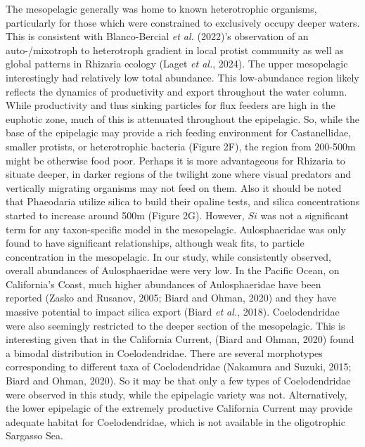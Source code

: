 \documentclass[
]{article}
\begin{document}
The mesopelagic generally was home to known heterotrophic organisms,
particularly for those which were constrained to exclusively occupy
deeper waters. This is consistent with Blanco-Bercial \emph{et al.}
(2022)'s observation of an auto-/mixotroph to heterotroph gradient in
local protist community as well as global patterns in Rhizaria ecology
(Laget \emph{et al.}, 2024). The upper mesopelagic interestingly had
relatively low total abundance. This low-abundance region likely
reflects the dynamics of productivity and export throughout the water
column. While productivity and thus sinking particles for flux feeders
are high in the euphotic zone, much of this is attenuated throughout the
epipelagic. So, while the base of the epipelagic may provide a rich
feeding environment for Castanellidae, smaller protists, or
heterotrophic bacteria (Figure 2F), the region from 200-500m might be
otherwise food poor. Perhaps it is more advantageous for Rhizaria to
situate deeper, in darker regions of the twilight zone where visual
predators and vertically migrating organisms may not feed on them. Also
it should be noted that Phaeodaria utilize silica to build their opaline
tests, and silica concentrations started to increase around 500m (Figure
2G). However, \(Si\) was not a significant term for any taxon-specific
model in the mesopelagic. Aulosphaeridae was only found to have
significant relationships, although weak fits, to particle concentration
in the mesopelagic. In our study, while consistently observed, overall
abundances of Aulosphaeridae were very low. In the Pacific Ocean, on
California's Coast, much higher abundances of Aulosphaeridae have been
reported (Zasko and Rusanov, 2005; Biard and Ohman, 2020) and they have
massive potential to impact silica export (Biard \emph{et al.}, 2018).
Coelodendridae were also seemingly restricted to the deeper section of
the mesopelagic. This is interesting given that in the California
Current, (Biard and Ohman, 2020) found a bimodal distribution in
Coelodendridae. There are several morphotypes corresponding to different
taxa of Coelodendridae (Nakamura and Suzuki, 2015; Biard and Ohman,
2020). So it may be that only a few types of Coelodendridae were
observed in this study, while the epipelagic variety was not.
Alternatively, the lower epipelagic of the extremely productive
California Current may provide adequate habitat for Coelodendridae,
which is not available in the oligotrophic Sargasso Sea.
\end{document}
